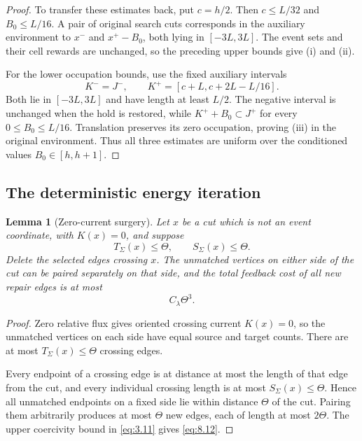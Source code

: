 \documentclass[11pt,reqno]{amsart}
\newtheorem{lemma}[theorem]{Lemma}
\theoremstyle{definition}
\theoremstyle{remark}
\numberwithin{equation}{section}
\begin{document}
\begin{proof}
To transfer these estimates back, put \(c=h/2\). Then
\(c\le L/32\) and \(B_0\le L/16\). A pair of original search
cuts corresponds in the auxiliary environment to
\(x^-\) and \(x^+-B_0\), both lying in \([-3L,3L]\).
The event sets and their cell rewards are unchanged, so the preceding
upper bounds give (i) and (ii).

For the lower occupation bounds, use the fixed auxiliary intervals
\[
K^-=J^-,\qquad
K^+=[c+L,c+2L-L/16].
\]
Both lie in \([-3L,3L]\) and have length at least \(L/2\).
The negative interval is unchanged when the hold is restored, while
\(K^++B_0\subset J^+\) for every \(0\le B_0\le L/16\).
Translation preserves its zero occupation, proving (iii) in the
original environment. Thus all three estimates are uniform over the
conditioned values \(B_0\in[h,h+1]\).
\end{proof}

\subsection{The deterministic energy iteration}

\begin{lemma}[Zero-current surgery]
\label{lem:zero-surgery-prove}
Let \(x\) be a cut which is not an event coordinate, with \(K(x)=0\), and suppose
\begin{equation}
T_\Sigma(x)\le\Theta,
\qquad
S_\Sigma(x)\le\Theta.
\label{eq:8.11}
\end{equation}
Delete the selected edges crossing \(x\).  The unmatched vertices on either side of the
cut can be paired separately on that side, and the total feedback cost of all new repair
edges is at most
\begin{equation}
C_\lambda\Theta^3.
\label{eq:8.12}
\end{equation}
\end{lemma}

\begin{proof}
Zero relative flux gives oriented crossing current \(K(x)=0\), so the unmatched
vertices on each side have equal source and target counts.  There are at most
\(T_\Sigma(x)\le\Theta\) crossing edges.

Every endpoint of a crossing edge is at distance at most the length of
that edge from the cut, and every individual crossing
length is at most \(S_\Sigma(x)\le\Theta\).  Hence all unmatched endpoints on a fixed
side lie within distance \(\Theta\) of the cut.  Pairing them arbitrarily produces at
most \(\Theta\) new edges, each of length at most \(2\Theta\).  The upper coercivity
bound in \eqref{eq:3.11} gives \eqref{eq:8.12}.
\end{proof}
\end{document}
